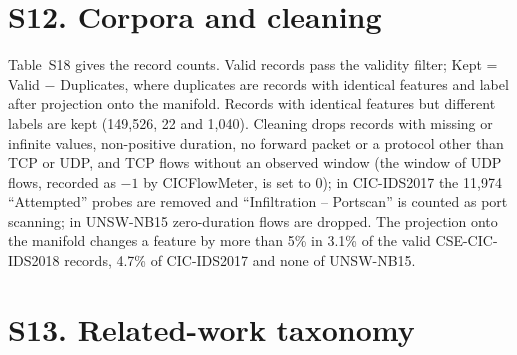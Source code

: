 \section*{S12. Corpora and cleaning}

Table~S18 gives the record counts. Valid records pass the validity filter; Kept = Valid $-$ Duplicates, where duplicates are records with identical features and label after projection onto the manifold. Records with identical features but different labels are kept (149,526, 22 and 1,040). Cleaning drops records with missing or infinite values, non-positive duration, no forward packet or a protocol other than TCP or UDP, and TCP flows without an observed window (the window of UDP flows, recorded as $-1$ by CICFlowMeter, is set to 0); in CIC-IDS2017 the 11,974 ``Attempted'' probes are removed and ``Infiltration -- Portscan'' is counted as port scanning; in UNSW-NB15 zero-duration flows are dropped. The projection onto the manifold changes a feature by more than 5\% in 3.1\% of the valid CSE-CIC-IDS2018 records, 4.7\% of CIC-IDS2017 and none of UNSW-NB15.

\begin{table}[!htbp]
\centering
\caption*{Table S18. Full-scale benchmark corpora.}
\footnotesize

\end{table}

\section*{S13. Related-work taxonomy}

